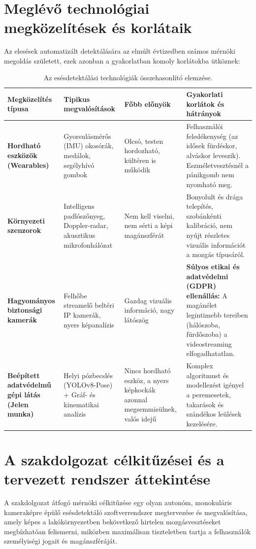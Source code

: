 \documentclass[12pt,a4paper,oneside]{report}
\begin{document}
\section{Meglévő technológiai megközelítések és korlátaik}
Az elesések automatizált detektálására az elmúlt évtizedben számos mérnöki megoldás született, ezek azonban a gyakorlatban komoly korlátokba ütköznek:

\begin{table}[H]
\centering
\small
\begin{tabularx}{\textwidth}{p{3.0cm}p{3.2cm}Xp{3.8cm}}
\toprule
\textbf{Megközelítés típusa} & \textbf{Tipikus megvalósítások} & \textbf{Főbb előnyök} & \textbf{Gyakorlati korlátok és hátrányok} \\
\midrule
\textbf{Hordható eszközök (Wearables)} & Gyorsulásmérős (IMU) okosórák, medálok, segélyhívó gombok \cite{kwolek2014} & Olcsó, testen hordozható, kültéren is működik & Felhasználói feledékenység (az idősek fürdéskor, alváskor leveszik). Eszméletvesztésnél a pánikgomb nem nyomható meg. \\
\midrule
\textbf{Környezeti szenzorok} & Intelligens padlószőnyeg, Doppler-radar, akusztikus mikrofonhálózat & Nem kell viselni, nem sérti a képi magánszférát & Bonyolult és drága telepítés, szobánkénti kalibráció, nem nyújt részletes vizuális információt a mozgás típusáról. \\
\midrule
\textbf{Hagyományos biztonsági kamerák} & Felhőbe streamelő beltéri IP kamerák, nyers képanalízis \cite{rougier2011} & Gazdag vizuális információ, nagy látószög & \textbf{Súlyos etikai és adatvédelmi (GDPR) ellenállás:} A magánélet legintimebb tereiben (hálószoba, fürdőszoba) a videostreaming elfogadhatatlan. \\
\midrule
\textbf{Beépített adatvédelmű gépi látás (Jelen munka)} & Helyi pózbecslés (YOLOv8-Pose) + Gráf- és kinematikai analízis & Nincs hordható eszköz, a nyers képkockák azonnal megsemmisülnek, valós idejű & Komplex algoritmust és modellezést igényel a peremesetek, takarások és szándékos leülések kezelésére. \\
\bottomrule
\end{tabularx}
\caption{Az esésdetektálási technológiák összehasonlító elemzése.}
\label{tab:tech_comparison}
\end{table}

\section{A szakdolgozat célkitűzései és a tervezett rendszer áttekintése}
A szakdolgozat átfogó mérnöki célkitűzése egy olyan autonóm, monokuláris kameraképre épülő esésdetektáló szoftverrendszer megtervezése és megvalósítása, amely képes a lakókörnyezetben bekövetkező hirtelen mozgásvesztéseket megbízhatóan felismerni, miközben maximálisan tiszteletben tartja a felhasználók személyiségi jogait és magánszféráját. 
\end{document}
